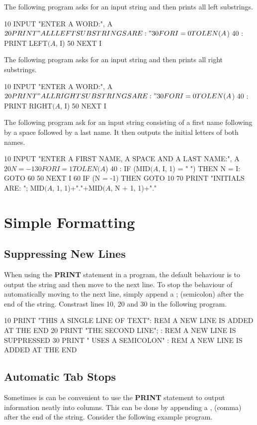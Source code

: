 The following program asks for an input string and then prints all left substrings.
\begin{screenoutput}
10 INPUT "ENTER A WORD:", A$
20 PRINT "ALL LEFT SUBSTRINGS ARE:"
30 FOR I = 0 TO LEN(A$)
40 :  PRINT LEFT$(A$, I)
50 NEXT I
\end{screenoutput}

The following program asks for an input string and then prints all right substrings.
\begin{screenoutput}
10 INPUT "ENTER A WORD:", A$
20 PRINT "ALL RIGHT SUBSTRINGS ARE:"
30 FOR I = 0 TO LEN(A$)
40 :  PRINT RIGHT$(A$, I)
50 NEXT I
\end{screenoutput}

The following program ask for an input string consisting of a first name following by a space followed by a last name. It then outputs the initial letters of both names.
\begin{screenoutput}
10 INPUT "ENTER A FIRST NAME, A SPACE AND A LAST NAME:", A$
20 N = -1
30 FOR I = 1 TO LEN(A$)
40 :  IF (MID$(A$, I, 1) = " ") THEN N = I: GOTO 60
50 NEXT I
60 IF (N = -1) THEN GOTO 10
70 PRINT "INITIALS ARE: "; MID$(A$, 1, 1)+"."+MID$(A$, N + 1, 1)+"."
\end{screenoutput}

\section{Simple Formatting}

\subsection{Suppressing New Lines}
When using the {\bf PRINT} statement in a program, the default behaviour is to output the string and then move to the next line. To stop the behaviour of automatically moving to the next line, simply append a ; (semicolon) after the end of the string. Constrast lines 10, 20 and 30 in the following program.

\begin{screenoutput}
10 PRINT "THIS A SINGLE LINE OF TEXT": REM A NEW LINE IS ADDED AT THE END
20 PRINT "THE SECOND LINE"; : REM A NEW LINE IS SUPPRESSED
30 PRINT " USES A SEMICOLON" : REM A NEW LINE IS ADDED AT THE END
\end{screenoutput}

\subsection{Automatic Tab Stops}
Sometimes is can be convenient to use the {\bf PRINT} statement to output information neatly into columns. This can be done by appending a , (comma) after the end of the string. Consider the following example program.

